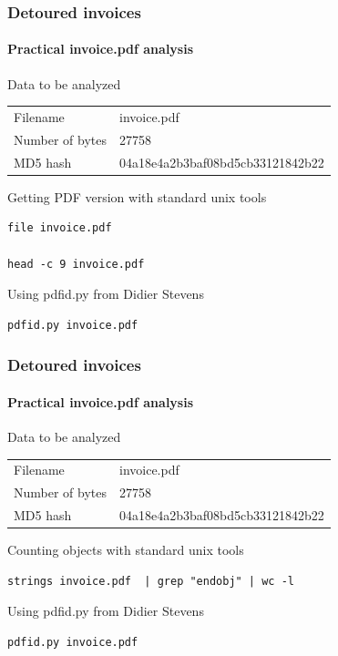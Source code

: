 \begin{frame}[fragile]
    \frametitle{Detoured invoices}
    \framesubtitle{Practical invoice.pdf analysis}
    \begin{block}{Data to be analyzed}
        \begin{tabular}{ll}
            Filename &   invoice.pdf\\
            Number of bytes & 27758\\
            MD5 hash &  04a18e4a2b3baf08bd5cb33121842b22
        \end{tabular}
    \end{block}

    \begin{block}{Getting PDF version with standard unix tools}
    \begin{lstlisting}
file invoice.pdf

head -c 9 invoice.pdf
    \end{lstlisting}
    \end{block}
    \begin{block}{Using pdfid.py from Didier Stevens}
        \begin{lstlisting}
pdfid.py invoice.pdf
        \end{lstlisting}
    \end{block}
\end{frame}


\begin{frame}[fragile]
    \frametitle{Detoured invoices}
    \framesubtitle{Practical invoice.pdf analysis}
    \begin{block}{Data to be analyzed}
        \begin{tabular}{ll}
            Filename &   invoice.pdf\\
            Number of bytes & 27758\\
            MD5 hash &  04a18e4a2b3baf08bd5cb33121842b22
        \end{tabular}
    \end{block}

    \begin{block}{Counting objects with standard unix tools}
    \begin{lstlisting}
strings invoice.pdf  | grep "endobj" | wc -l
    \end{lstlisting}
    \end{block}
    \begin{block}{Using pdfid.py from Didier Stevens}
        \begin{lstlisting}
pdfid.py invoice.pdf
        \end{lstlisting}
    \end{block}
\end{frame}

